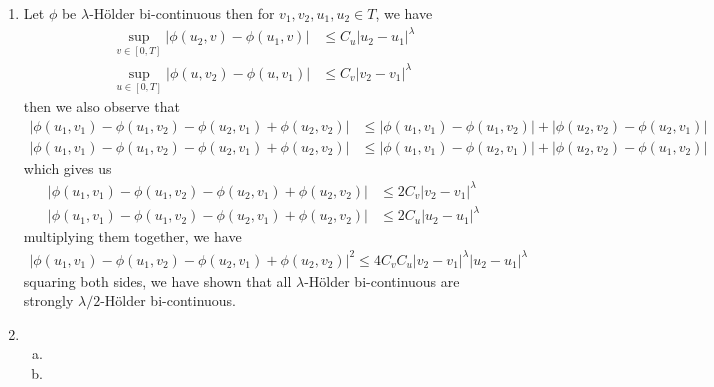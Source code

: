 \documentclass[a4paper,12pt]{article}
\theoremstyle{definition}
\begin{document}
\begin{enumerate}
\item Let $\phi$ be $\lambda$-H\"{o}lder bi-continuous then for $v_1, v_2, u_1, u_2 \in T$, we have
\begin{align*}
\sup_{v \in [0,T]}|\phi(u_2,v)-\phi(u_1,v)| &\leq C_u|u_2-u_1|^\lambda\\
\sup_{u \in [0,T]}|\phi(u,v_2)-\phi(u,v_1)| &\leq C_v|v_2-v_1|^\lambda
\end{align*}
then we also observe that 
\begin{align*}
|\phi(u_1,v_1)-\phi(u_1,v_2)-\phi(u_2,v_1)+\phi(u_2,v_2)| &\leq |\phi(u_1,v_1)-\phi(u_1,v_2)|+|\phi(u_2,v_2)-\phi(u_2,v_1)| \\
|\phi(u_1,v_1)-\phi(u_1,v_2)-\phi(u_2,v_1)+\phi(u_2,v_2)| &\leq |\phi(u_1,v_1)-\phi(u_2,v_1)|+|\phi(u_2,v_2)-\phi(u_1,v_2)|
\end{align*}
which gives us 
\begin{align*}
|\phi(u_1,v_1)-\phi(u_1,v_2)-\phi(u_2,v_1)+\phi(u_2,v_2)| &\leq 2C_v|v_2-v_1|^\lambda \\
|\phi(u_1,v_1)-\phi(u_1,v_2)-\phi(u_2,v_1)+\phi(u_2,v_2)| &\leq 2C_u|u_2-u_1|^\lambda
\end{align*}
multiplying them together, we have 
\begin{align*}
|\phi(u_1,v_1)-\phi(u_1,v_2)-\phi(u_2,v_1)+\phi(u_2,v_2)|^2 \leq 4C_vC_u|v_2-v_1|^\lambda |u_2-u_1|^\lambda
\end{align*}
squaring both sides, we have shown that all $\lambda$-H\"{o}lder bi-continuous are strongly $\lambda/2$-H\"{o}lder bi-continuous.



\item
\begin{enumerate}[(a)]
\item 

\item
\end{enumerate}


\end{enumerate}
\end{document}
